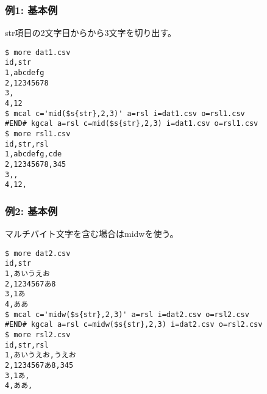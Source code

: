 \subsubsection*{例1: 基本例}

str項目の2文字目からから3文字を切り出す。


\begin{Verbatim}[baselinestretch=0.7,frame=single]
$ more dat1.csv
id,str
1,abcdefg
2,12345678
3,
4,12
$ mcal c='mid($s{str},2,3)' a=rsl i=dat1.csv o=rsl1.csv
#END# kgcal a=rsl c=mid($s{str},2,3) i=dat1.csv o=rsl1.csv
$ more rsl1.csv
id,str,rsl
1,abcdefg,cde
2,12345678,345
3,,
4,12,
\end{Verbatim}
\subsubsection*{例2: 基本例}

マルチバイト文字を含む場合はmidwを使う。


\begin{Verbatim}[baselinestretch=0.7,frame=single]
$ more dat2.csv
id,str
1,あいうえお
2,1234567あ8
3,1あ
4,ああ
$ mcal c='midw($s{str},2,3)' a=rsl i=dat2.csv o=rsl2.csv
#END# kgcal a=rsl c=midw($s{str},2,3) i=dat2.csv o=rsl2.csv
$ more rsl2.csv
id,str,rsl
1,あいうえお,うえお
2,1234567あ8,345
3,1あ,
4,ああ,
\end{Verbatim}
